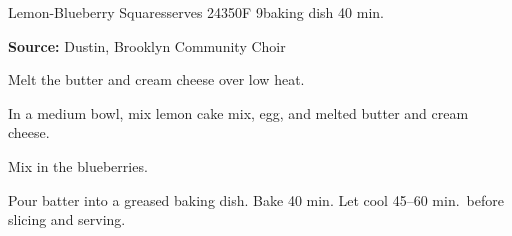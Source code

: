 \begin{recipe}{Lemon-Blueberry Squares}{serves 24}{350\0F \hfill 9\inch{}\inch baking dish \hfill 40 min.}

 \freeform \textbf{Source:} Dustin, Brooklyn Community Choir

 Melt the butter and cream cheese over low heat.

 In a medium bowl, mix lemon cake mix, egg, and melted butter and cream cheese.

 Mix in the blueberries.

 \newstep Pour batter into a greased baking dish. Bake 40 min. Let cool 45--60 min.\ before slicing and serving.
\end{recipe}
